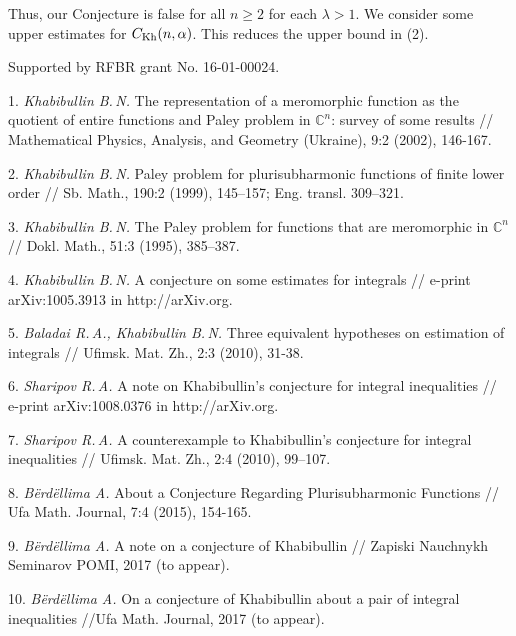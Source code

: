 Thus, our Conjecture is false for all $n\geqslant 2$ for each  $\lambda >1$. We consider some upper estimates for
$C_{{\rm Kh}}(n,\alpha)$. This reduces the upper bound in (2).

Supported by RFBR grant No. 16-01-00024.


\litlist

1. {\it Khabibullin B.\,N.\/} The representation of a meromorphic fun\-c\-t\-i\-on as the quotient of entire functions and Paley problem in $\mathbb C^n$: survey of some results // Mathematical Physics, Analysis, and Geometry (Ukraine), 9:2 (2002), 146-167.

2. {\it Khabibullin B.\,N.\/} Paley problem for plurisubharmonic fun\-c\-t\-i\-ons of finite lower order // Sb. Math., 190:2 (1999), 145--157; Eng. transl. 309–321.

3. {\it Khabibullin B.\,N.\/} The Paley problem for functions that are meromorphic in $\mathbb C^n$ // Dokl. Math., 51:3 (1995), 385–387.

4. {\it Khabibullin B.\,N.\/} A conjecture on some estimates for integr\-als // e-print arXiv:1005.3913 in http://arXiv.org.

5. {\it Baladai R.\,A., Khabibullin B.\,N.\/} Three equivalent hypotheses on estimation of integrals // Ufimsk. Mat. Zh., 2:3 (2010), 31-38.

6. {\it Sharipov R.\,A.\/} A note on Khabibullin's conjecture for integral inequalities // e-print arXiv:1008.0376 in http://arXiv.org.

7. {\it Sharipov R.\,A.\/} A counterexample to Khabibullin's conjecture for integral inequalities // Ufimsk. Mat. Zh., 2:4 (2010), 99–107.

8. {\it B\"erd\"ellima A.\/} About a Conjecture Regarding Plurisubharm\-o\-n\-ic Functions // Ufa Math. Journal, 7:4 (2015), 154-165.


9. {\it B\"erd\"ellima A.\/} A note on a conjecture of Khabibullin //
Zapiski Nauchnykh Seminarov POMI, 2017 (to appear).

10. {\it B\"erd\"ellima A.\/} On a conjecture of Khabibullin about a pair of integral inequalities //Ufa Math. Journal, 2017 (to appear).



